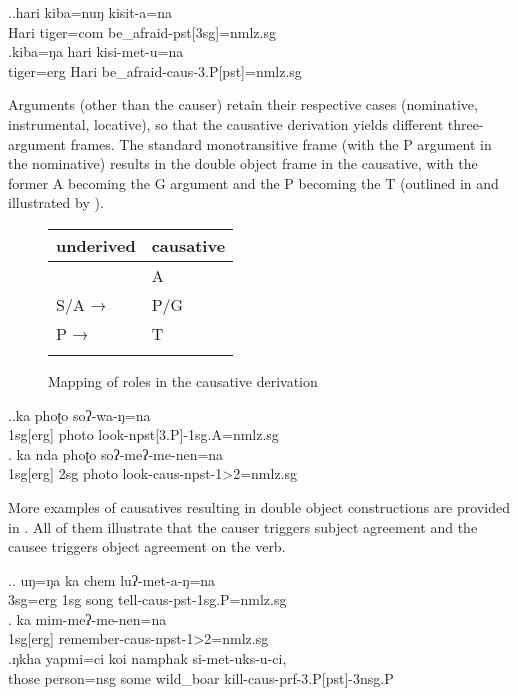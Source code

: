 \ex.\ag.hari kiba=nuŋ kisit-a=na\\
Hari tiger{\sc =com} be\_afraid{\sc -pst[3sg]=nmlz.sg}\\
\bg.kiba=ŋa hari kisi-met-u=na\\
tiger{\sc =erg} Hari be\_afraid{\sc -caus-3.P[pst]=nmlz.sg}\\


Arguments (other than the causer) retain their respective cases (nominative, instrumental, locative), so that the causative derivation yields different three-argument frames. The standard monotransitive frame (with the P argument in the nominative) results in the double object frame in the causative, with the former A becoming the G argument and the P becoming the T (outlined in  and illustrated by \Next). 

\begin{figure}[htp]
\begin{center}
{\small
\begin{tabular}{ll}
\lsptoprule
{\sc underived}&{\sc causative} \\
\midrule
& A\\
S/A →&P/G \\
P →& T\\

\lspbottomrule
\end{tabular}
}
\end{center}
\caption{Mapping of roles in the causative derivation}\label{fig-caus}
\end{figure}
 
 

 
\ex.\ag.ka phoʈo soʔ-wa-ŋ=na\\
{\sc 1sg[erg]} photo look{\sc -npst[3.P]-1sg.A=nmlz.sg}\\
\bg. ka nda phoʈo soʔ-meʔ-me-nen=na\\
{\sc 1sg[erg]} {\sc 2sg} photo look{\sc -caus-npst-1>2=nmlz.sg}\\
 
 
 
More examples of causatives resulting in double object constructions are provided in \Next. All of them illustrate  that the causer triggers subject agreement and the causee triggers object agreement on the verb. 

\ex.\ag. uŋ=ŋa ka chem luʔ-met-a-ŋ=na\\
{\sc 3sg=erg} {\sc 1sg} song tell{\sc -caus-pst-1sg.P=nmlz.sg}\\
\bg. ka mim-meʔ-me-nen=na\\
{\sc 1sg[erg]} remember{\sc -caus-npst-1>2=nmlz.sg} \\
\bg.ŋkha yapmi=ci    koi  namphak   si-met-uks-u-ci, \\
those person{\sc =nsg} some wild\_boar kill{\sc -caus-prf-3.P[pst]-3nsg.P}\\

